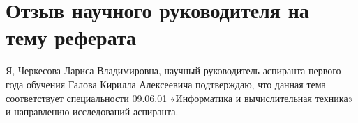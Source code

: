 \clearpage



\clearpage
{}
\section*{Отзыв научного руководителя на тему реферата}
Я, Черкесова Лариса Владимировна, научный руководитель аспиранта первого года обучения Галова Кирилла Алексеевича подтверждаю, что данная тема соответствует специальности 09.06.01 «Информатика и вычислительная техника» и направлению исследований аспиранта.
\bigskip


